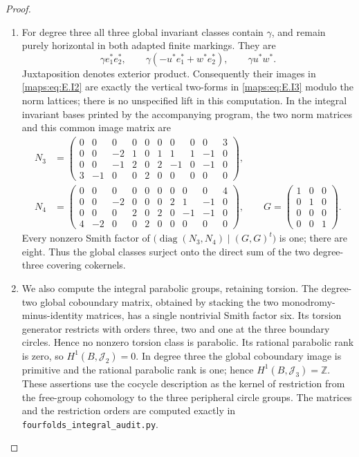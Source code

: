 \begin{proof}
\begin{enumerate}[label=\arabic*.,leftmargin=*]
\item For degree three all three global invariant classes contain
\(\gamma\), and remain purely horizontal in both adapted
finite markings. They are
\[
 \gamma e_1^*e_2^*,\qquad
 \gamma(-u^*e_1^*+w^*e_2^*),\qquad
 \gamma u^*w^* .
 \tag{E.I3}\label{maps:eq:E.I3}
\]
Juxtaposition denotes exterior product. Consequently their images
in \eqref{maps:eq:E.I2} are exactly the vertical two-forms in \eqref{maps:eq:E.I3} modulo the
norm lattices; there is no unspecified lift in this computation.
In the integral invariant bases printed by the accompanying program,
the two norm matrices and this common image matrix are
\[
\begin{split}
N_3&=\begin{pmatrix}
0&0&0&0&0&0&0&0&0&3\\
0&0&-2&1&0&1&1&1&-1&0\\
0&0&-1&2&0&2&-1&0&-1&0\\
3&-1&0&0&2&0&0&0&0&0
\end{pmatrix},\\
N_4&=\begin{pmatrix}
0&0&0&0&0&0&0&0&0&4\\
0&0&-2&0&0&0&2&1&-1&0\\
0&0&0&2&0&2&0&-1&-1&0\\
4&-2&0&0&2&0&0&0&0&0
\end{pmatrix},\qquad
G=\begin{pmatrix}1&0&0\\0&1&0\\0&0&0\\0&0&1\end{pmatrix}.
\end{split}
\]
Every nonzero Smith factor of
\(\bigl(\operatorname{diag}(N_3,N_4)\mid(G,G)^t\bigr)\)
is one; there are eight. Thus the global classes surject onto
the direct sum of the two degree-three covering cokernels.

\item We also compute the integral parabolic groups, retaining torsion.
The degree-two global coboundary matrix, obtained by stacking
the two monodromy-minus-identity matrices, has a single nontrivial
Smith factor six. Its torsion generator restricts with orders
three, two and one at the three boundary circles. Hence no
nonzero torsion class is parabolic. Its rational parabolic rank
is zero, so \(H^1(B,\mathcal J_2)=0\). In degree three the
global coboundary image is primitive and the rational parabolic
rank is one; hence \(H^1(B,\mathcal J_3)=\mathbb Z\).
These assertions use the cocycle description as the kernel of
restriction from the free-group cohomology to the three
peripheral circle groups. The matrices and the restriction
orders are computed exactly in
\texttt{fourfolds\_integral\_audit.py}.


\end{enumerate}
\end{proof}
